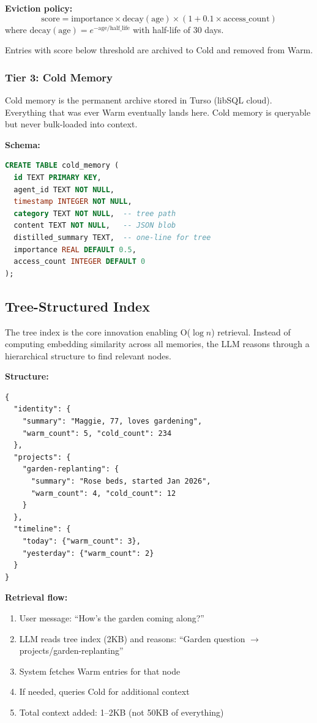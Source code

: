 \documentclass{article}
\begin{document}
\textbf{Eviction policy:}
\begin{equation}
\text{score} = \text{importance} \times \text{decay}(\text{age}) \times (1 + 0.1 \times \text{access\_count})
\end{equation}
where $\text{decay}(\text{age}) = e^{-\text{age}/\text{half\_life}}$ with half-life of 30 days.

Entries with score below threshold are archived to Cold and removed from Warm.

\subsubsection{Tier 3: Cold Memory}

Cold memory is the permanent archive stored in Turso (libSQL cloud). Everything that was ever Warm eventually lands here. Cold memory is queryable but never bulk-loaded into context.

\textbf{Schema:}
\begin{lstlisting}[language=SQL]
CREATE TABLE cold_memory (
  id TEXT PRIMARY KEY,
  agent_id TEXT NOT NULL,
  timestamp INTEGER NOT NULL,
  category TEXT NOT NULL,  -- tree path
  content TEXT NOT NULL,   -- JSON blob
  distilled_summary TEXT,  -- one-line for tree
  importance REAL DEFAULT 0.5,
  access_count INTEGER DEFAULT 0
);
\end{lstlisting}

\subsection{Tree-Structured Index}

The tree index is the core innovation enabling O($\log n$) retrieval. Instead of computing embedding similarity across all memories, the LLM reasons through a hierarchical structure to find relevant nodes.

\textbf{Structure:}
\begin{lstlisting}[style=jsoncode]
{
  "identity": {
    "summary": "Maggie, 77, loves gardening",
    "warm_count": 5, "cold_count": 234
  },
  "projects": {
    "garden-replanting": {
      "summary": "Rose beds, started Jan 2026",
      "warm_count": 4, "cold_count": 12
    }
  },
  "timeline": {
    "today": {"warm_count": 3},
    "yesterday": {"warm_count": 2}
  }
}
\end{lstlisting}

\textbf{Retrieval flow:}
\begin{enumerate}[leftmargin=*]
    \item User message: ``How's the garden coming along?''
    \item LLM reads tree index (2KB) and reasons: ``Garden question $\to$ projects/garden-replanting''
    \item System fetches Warm entries for that node
    \item If needed, queries Cold for additional context
    \item Total context added: 1--2KB (not 50KB of everything)
\end{enumerate}
\end{document}
